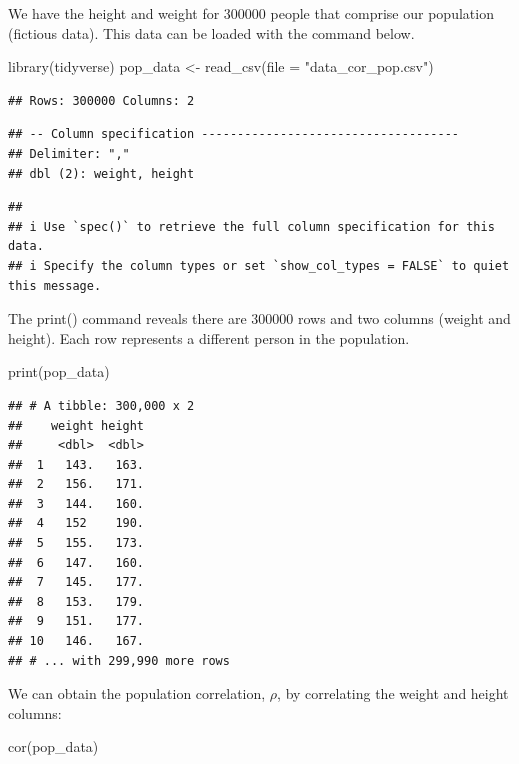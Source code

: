 \documentclass[
]{krantz}
\makeatletter
\newenvironment{Shaded}{\begin{snugshade}}{\end{snugshade}}
\newcommand{\AttributeTok}[1]{\textcolor[rgb]{0.61,0.61,0.61}{#1}}
\newcommand{\FunctionTok}[1]{\textcolor[rgb]{0,0,0}{#1}}
\newcommand{\NormalTok}[1]{#1}
\newcommand{\OtherTok}[1]{\textcolor[rgb]{0.37,0.37,0.37}{#1}}
\newcommand{\StringTok}[1]{\textcolor[rgb]{0.5,0.5,0.5}{#1}}
\newenvironment{kframe}{%
\medskip{}
\setlength{\fboxsep}{.8em}
 \def\at@end@of@kframe{}%
 \ifinner\ifhmode%
  \def\at@end@of@kframe{\end{minipage}}%
  \begin{minipage}{\columnwidth}%
 \fi\fi%
 \def\FrameCommand##1{\hskip\@totalleftmargin \hskip-\fboxsep
 \colorbox{shadecolor}{##1}\hskip-\fboxsep
     \hskip-\linewidth \hskip-\@totalleftmargin \hskip\columnwidth}%
 \MakeFramed {\advance\hsize-\width
   \@totalleftmargin\z@ \linewidth\hsize
   \@setminipage}}%
 {\par\unskip\endMakeFramed%
 \at@end@of@kframe}
\renewenvironment{Shaded}{\begin{kframe}}{\end{kframe}}
\makeatother
\begin{document}
We have the height and weight for 300000 people that comprise our population (fictious data). This data can be loaded with the command below.

\begin{Shaded}
\begin{Highlighting}[]
\FunctionTok{library}\NormalTok{(tidyverse)}
\NormalTok{pop\_data }\OtherTok{\textless{}{-}} \FunctionTok{read\_csv}\NormalTok{(}\AttributeTok{file =} \StringTok{"data\_cor\_pop.csv"}\NormalTok{)}
\end{Highlighting}
\end{Shaded}

\begin{verbatim}
## Rows: 300000 Columns: 2
\end{verbatim}

\begin{verbatim}
## -- Column specification ------------------------------------
## Delimiter: ","
## dbl (2): weight, height
\end{verbatim}

\begin{verbatim}
## 
## i Use `spec()` to retrieve the full column specification for this data.
## i Specify the column types or set `show_col_types = FALSE` to quiet this message.
\end{verbatim}

The print() command reveals there are 300000 rows and two columns (weight and height). Each row represents a different person in the population.

\begin{Shaded}
\begin{Highlighting}[]
\FunctionTok{print}\NormalTok{(pop\_data)}
\end{Highlighting}
\end{Shaded}

\begin{verbatim}
## # A tibble: 300,000 x 2
##    weight height
##     <dbl>  <dbl>
##  1   143.   163.
##  2   156.   171.
##  3   144.   160.
##  4   152    190.
##  5   155.   173.
##  6   147.   160.
##  7   145.   177.
##  8   153.   179.
##  9   151.   177.
## 10   146.   167.
## # ... with 299,990 more rows
\end{verbatim}

We can obtain the population correlation, \(\rho\), by correlating the weight and height columns:

\begin{Shaded}
\begin{Highlighting}[]
\FunctionTok{cor}\NormalTok{(pop\_data)}
\end{Highlighting}
\end{Shaded}
\end{document}
